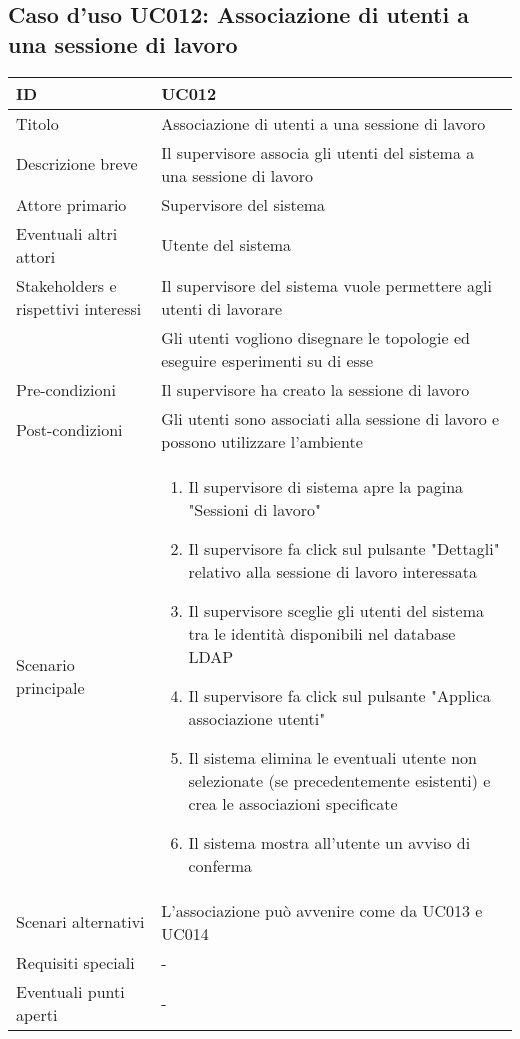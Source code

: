\documentclass[../../main.tex]{subfiles}
\begin{document}
\subsection{Caso d’uso UC012: Associazione di utenti a una sessione di lavoro }
\begin{tabularx}{150mm}{|l|X|}
    \hline
    ID                                  & \textbf{UC012}\\
    \hline
    Titolo                              & Associazione di utenti a una sessione di lavoro \\
    \hline
    Descrizione breve                   & Il supervisore associa gli utenti del sistema a una sessione di lavoro   \\
    \hline
    Attore primario                     & Supervisore del sistema   \\
    \hline
    Eventuali altri attori              & Utente del sistema   \\
    \hline
    Stakeholders e rispettivi interessi & Il supervisore del sistema vuole permettere agli utenti di lavorare   \\ & Gli utenti vogliono disegnare le topologie ed eseguire esperimenti su di esse   \\
    \hline
    Pre-condizioni                      & Il supervisore ha creato la sessione di lavoro   \\
    \hline
    Post-condizioni                     & Gli utenti sono associati alla sessione di lavoro e possono utilizzare l'ambiente   \\
    \hline
    Scenario principale                 & 
    \begin{enumerate}
        \item Il supervisore di sistema apre la pagina "Sessioni di lavoro"
        \item Il supervisore fa click sul pulsante "Dettagli" relativo alla sessione di lavoro interessata
        \item Il supervisore sceglie gli utenti del sistema tra le identità disponibili nel database LDAP
        \item Il supervisore fa click sul pulsante "Applica associazione utenti"
        \item Il sistema elimina le eventuali utente non selezionate (se precedentemente esistenti) e crea le associazioni specificate
        \item Il sistema mostra all'utente un avviso di conferma
    \end{enumerate}
    \\
    \hline
    Scenari alternativi                 &    L'associazione può avvenire come da UC013 e UC014\\
    \hline
    Requisiti speciali                  &    -\\
    \hline
    Eventuali punti aperti              &    -\\
    \hline
\end{tabularx}
\vfill\newpage
\end{document}

